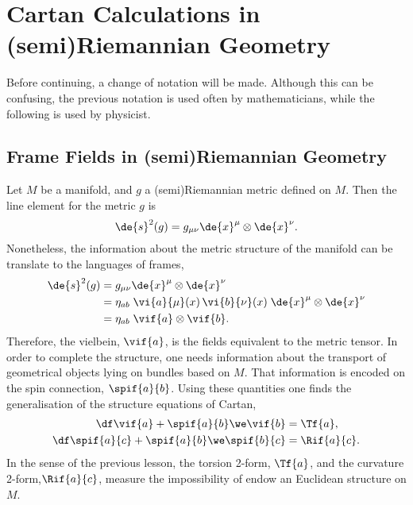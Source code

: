 
\chapter{Cartan Calculations in (semi)Riemannian Geometry}

Before continuing, a change of notation will be made. Although this can be confusing, the previous notation is used often by mathematicians, while the following is used by physicist.

\section{Frame Fields in (semi)Riemannian Geometry}


Let $M$ be a manifold, and $g$ a (semi)Riemannian metric defined on $M$. Then the line element for the metric $g$ is
\begin{equation}
  \de{s}^2(g) = g_{\mu\nu} \de{x}^\mu \otimes \de{x}^\nu.
\end{equation}
Nonetheless, the information about the metric structure of the manifold can be translate to the languages of frames,
\begin{equation}
  \begin{split}
    \de{s}^2(g)
    &= g_{\mu\nu} \de{x}^\mu \otimes \de{x}^\nu \\
    &= \eta_{ab} \; \vi{a}{\mu}(x) \, \vi{b}{\nu}(x) \; \de{x}^\mu \otimes \de{x}^\nu \\
    &= \eta_{ab} \; \vif{a} \otimes \vif{b}.
  \end{split}
\end{equation}
Therefore, the vielbein, $\vif{a}$, is the fields equivalent to the metric tensor. In order to complete the structure, one needs information about the transport of geometrical objects lying on bundles based on $M$. That information is encoded on the spin connection, $\spif{a}{b}$. Using these quantities one finds  the generalisation of the structure equations of Cartan,
\begin{align}
  \df \vif{a} + \spif{a}{b} \we \vif{b} &= \Tf{a},
  \label{firstSE}\\
  \df \spif{a}{c} + \spif{a}{b} \we \spif{b}{c} &= \Rif{a}{c}
  \label{secondSE}.
\end{align}
In the sense of the previous lesson, the torsion 2-form, $\Tf{a}$, and the curvature 2-form,$\Rif{a}{c}$, measure the impossibility of endow an Euclidean structure on $M$.

